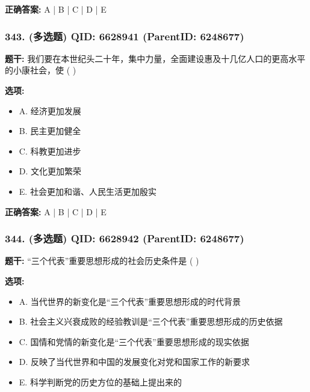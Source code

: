 \documentclass[12pt,UTF8]{ctexart}
\begin{document}
\textbf{正确答案:}
A | B | C | D | E

\vspace{0.3em}\hrulefill\vspace{0.7em}

\subsubsection*{343. (多选题) \small QID: 6628941 (ParentID: 6248677)}

\textbf{题干:}
我们要在本世纪头二十年，集中力量，全面建设惠及十几亿人口的更高水平的小康社会，使  ( )



\textbf{选项:}
\begin{itemize}[leftmargin=*]

  \item A. 经济更加发展

  \item B. 民主更加健全

  \item C. 科教更加进步

  \item D. 文化更加繁荣

  \item E. 社会更加和谐、人民生活更加殷实

\end{itemize}

\textbf{正确答案:}
A | B | C | D | E

\vspace{0.3em}\hrulefill\vspace{0.7em}

\subsubsection*{344. (多选题) \small QID: 6628942 (ParentID: 6248677)}

\textbf{题干:}
“三个代表”重要思想形成的社会历史条件是  ( )



\textbf{选项:}
\begin{itemize}[leftmargin=*]

  \item A. 当代世界的新变化是“三个代表”重要思想形成的时代背景

  \item B. 社会主义兴衰成败的经验教训是“三个代表”重要思想形成的历史依据

  \item C. 国情和党情的新变化是“三个代表”重要思想形成的现实依据

  \item D. 反映了当代世界和中国的发展变化对党和国家工作的新要求

  \item E. 科学判断党的历史方位的基础上提出来的

\end{itemize}
\end{document}
